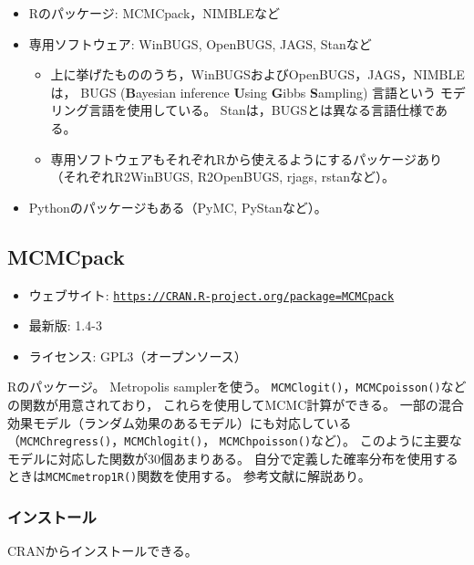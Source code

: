 \documentclass[11pt,uplatex]{jsarticle}
\begin{document}
\begin{itemize}
\item  \textsf{R}のパッケージ: \textsf{MCMCpack}，\textsf{NIMBLE}など
\item 専用ソフトウェア: \textsf{WinBUGS}, \textsf{OpenBUGS}, \textsf{JAGS}, \textsf{Stan}など
\begin{itemize}
 \item  上に挙げたもののうち，\textsf{WinBUGS}および\textsf{OpenBUGS}，\textsf{JAGS}，\textsf{NIMBLE}は，
 BUGS (\textbf{B}ayesian inference \textbf{U}sing \textbf{G}ibbs \textbf{S}ampling)
 言語\cite{BUGSBook, BUGS}という モデリング言語を使用している。
 \label{BUGS}
\textsf{Stan}は，BUGSとは異なる言語仕様である。
\item  専用ソフトウェアもそれぞれ\textsf{R}から使えるようにするパッケージあり
（それぞれ\textsf{R2WinBUGS}, \textsf{R2OpenBUGS}, \textsf{rjags}, \textsf{rstan}など）。
\end{itemize}
\item \textsf{Python}のパッケージもある（\textsf{PyMC}, \textsf{PyStan}など）。
\end{itemize}

\subsection{MCMCpack}

\begin{itemize}
\item ウェブサイト: \texttt{\url{https://CRAN.R-project.org/package=MCMCpack}}
\item 最新版: 1.4-3
\item ライセンス: GPL3（オープンソース）
\end{itemize}

\textsf{R}のパッケージ。
Metropolis samplerを使う。
\texttt{MCMClogit()}，\texttt{MCMCpoisson()}などの関数が用意されており，
これらを使用してMCMC計算ができる。
一部の混合効果モデル（ランダム効果のあるモデル）にも対応している
（\texttt{MCMChregress()}，\texttt{MCMChlogit()}，
\texttt{MCMChpoisson()}など）。
このように主要なモデルに対応した関数が30個あまりある。
自分で定義した確率分布を使用するときは\texttt{MCMCmetrop1R()}関数を使用する。
参考文献\cite{MCMCpack}に解説あり。


\subsubsection*{インストール}
CRANからインストールできる。
\end{document}
